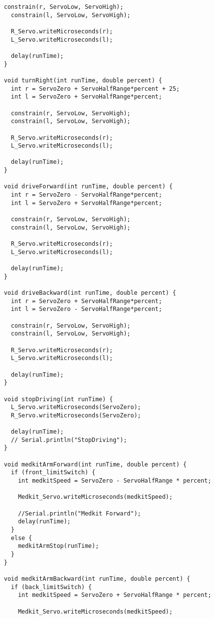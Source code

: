 \begin{lstlisting}[style=myArduino]
  constrain(r, ServoLow, ServoHigh);
  constrain(l, ServoLow, ServoHigh);

  R_Servo.writeMicroseconds(r);
  L_Servo.writeMicroseconds(l);

  delay(runTime);
}

void turnRight(int runTime, double percent) {
  int r = ServoZero + ServoHalfRange*percent + 25;
  int l = ServoZero + ServoHalfRange*percent;

  constrain(r, ServoLow, ServoHigh);
  constrain(l, ServoLow, ServoHigh);

  R_Servo.writeMicroseconds(r);
  L_Servo.writeMicroseconds(l);

  delay(runTime);
}

void driveForward(int runTime, double percent) {
  int r = ServoZero - ServoHalfRange*percent;
  int l = ServoZero + ServoHalfRange*percent;

  constrain(r, ServoLow, ServoHigh);
  constrain(l, ServoLow, ServoHigh);

  R_Servo.writeMicroseconds(r);
  L_Servo.writeMicroseconds(l);

  delay(runTime);
}

void driveBackward(int runTime, double percent) {
  int r = ServoZero + ServoHalfRange*percent;
  int l = ServoZero - ServoHalfRange*percent;

  constrain(r, ServoLow, ServoHigh);
  constrain(l, ServoLow, ServoHigh);

  R_Servo.writeMicroseconds(r);
  L_Servo.writeMicroseconds(l);

  delay(runTime);
}

void stopDriving(int runTime) {
  L_Servo.writeMicroseconds(ServoZero);
  R_Servo.writeMicroseconds(ServoZero);

  delay(runTime);
  // Serial.println("StopDriving");
}

void medkitArmForward(int runTime, double percent) {
  if (front_limitSwitch) {
    int medkitSpeed = ServoZero - ServoHalfRange * percent;

    Medkit_Servo.writeMicroseconds(medkitSpeed);

    //Serial.println("Medkit Forward");
    delay(runTime);
  }
  else {
    medkitArmStop(runTime);
  }
}

void medkitArmBackward(int runTime, double percent) {
  if (back_limitSwitch) {
    int medkitSpeed = ServoZero + ServoHalfRange * percent;

    Medkit_Servo.writeMicroseconds(medkitSpeed);


\end{lstlisting}
